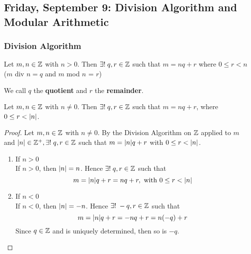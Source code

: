 \subsection{Friday, September 9: Division Algorithm and Modular
Arithmetic}

\subsubsection{Division Algorithm}

\begin{definition}
    Let $m, n \in \mathbb{Z}$ with $n > 0$. Then $\exists! \; q, r \in \mathbb{Z}$ such that $m = nq + r$ where $0 \leq r < n$ ($m$ div $n = q$ and $m$ mod $n$ = $r$) 
\end{definition}

\begin{remark}
    We call $q$ the \textbf{quotient} and $r$ the \textbf{remainder}.
\end{remark}

\begin{exercise}
    Let $m, n \in \mathbb{Z}$ with $n \neq 0$. Then $\exists! \; q, r \in \mathbb{Z}$ such that $m = nq + r$, where $0 \leq r < \qty|n|$.
\end{exercise}

\begin{proof}
    Let $m, n \in \mathbb{Z}$ with $n \neq 0$. By the Division Algorithm on $\mathbb{Z}$ applied to $m$  and $\qty|n| \in \mathbb{Z}^+, \exists! \; q, r \in \mathbb{Z}$ such that $m = \qty|n|q + r$ with $0 \leq r < \qty|n|$.
    \begin{myspace}
        \begin{enumerate}[label=\textbf{Case \arabic*:}]
            \item If $n > 0$ \\
            If $n > 0$, then $\qty|n| = n$. Hence $\exists! \; q, r \in \mathbb{Z}$ such that
            \[ m = \qty|n|q + r = nq + r, \text{ with } 0 \leq r < \qty|n| \]
            \item If $n < 0$ \\
            If $n < 0$, then $\qty|n| = -n$. Hence $\exists! \; -q, r \in \mathbb{Z}$ such that  
            \[ m = \qty|n|q + r = -nq + r = n \qty(-q) + r \]
            Since $q \in \mathbb{Z}$ and is uniquely determined, then so is $-q$.
        \end{enumerate}
    \end{myspace}
\end{proof}


